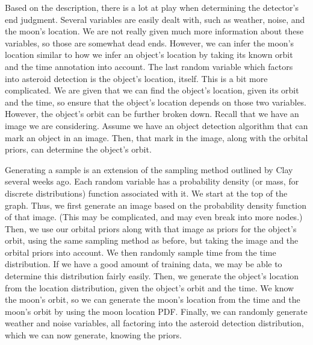 \documentclass{article}
\begin{document}
Based on the description, there is a lot at play when determining the detector's 
end judgment. Several variables are easily dealt with, such as weather, noise, 
and the moon's location. We are not really given much more information about these 
variables, so those are somewhat dead ends. However, we can infer the moon's 
location similar to how we infer an object's location by taking its known orbit 
and the time annotation into account. The last random variable which factors into 
asteroid detection is the object's location, itself. This is a bit more complicated. 
We are given that we can find the object's location, given its orbit and the time, 
so ensure that the object's location depends on those two variables. However, the 
object's orbit can be further broken down. Recall that we have an image we are 
considering. Assume we have an object detection algorithm that can mark an object 
in an image. Then, that mark in the image, along with the orbital priors, can 
determine the object's orbit.

Generating a sample is an extension of the sampling method outlined by Clay 
several weeks ago. Each random variable has a probability density (or mass, for 
discrete distributions) function associated with it. We 
start at the top of the graph. Thus, we first generate an image based on the 
probability density function of that image. (This may be complicated, and may 
even break into more nodes.) Then, we use our orbital priors along with that image 
as priors for the object's orbit, using the same sampling method as before, but 
taking the image and the orbital priors into account. We then randomly sample time 
from the time distribution. If we have a good amount of training data, we may be 
able to determine this distribution fairly easily. Then, we generate the object's 
location from the location distribution, given the object's orbit and the time. 
We know the moon's orbit, so we can generate the moon's location from the time 
and the moon's orbit by using the moon location PDF. Finally, we can randomly 
generate weather and noise variables, all factoring into the asteroid detection 
distribution, which we can now generate, knowing the priors.
\end{document}
